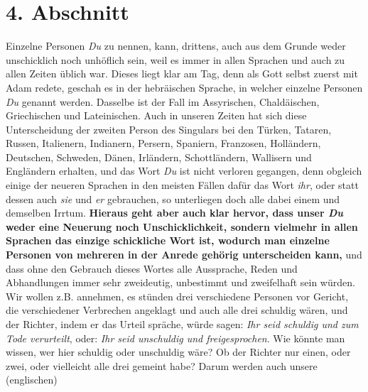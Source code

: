 \section{4. Abschnitt} \label{kap10_ab4}

Einzelne Personen \textit{Du} zu nennen, kann, drittens, auch aus dem Grunde
weder
unschicklich noch unhöflich sein, weil es immer in allen Sprachen und auch zu
allen Zeiten üblich war. Dieses liegt klar am Tag, denn als Gott selbst zuerst
mit Adam redete, geschah es in der hebräischen Sprache, in welcher einzelne
Personen \textit{Du} genannt werden. Dasselbe ist der Fall im
Assyrischen,
Chaldäischen, Griechischen
und Lateinischen. Auch in unseren Zeiten hat sich
diese Unterscheidung der zweiten Person des Singulars bei den
Türken, Tataren,
Russen, Italienern,
Indianern, Persern,
Spaniern, Franzosen,
Holländern,
Deutschen, Schweden,
Dänen, Irländern,
Schottländern, Wallisern
und Engländern erhalten, und das Wort \textit{Du}
ist nicht verloren gegangen,
denn obgleich einige der neueren Sprachen in den meisten Fällen dafür das Wort
\textit{ihr}, oder statt dessen auch \textit{sie} und \textit{er} gebrauchen, so
unterliegen
doch alle dabei einem und demselben Irrtum. \textbf{Hieraus geht aber auch
klar
hervor, dass unser \textit{Du} weder eine Neuerung noch Unschicklichkeit, sondern
vielmehr in allen Sprachen das einzige schickliche Wort ist, wodurch man
einzelne Personen von mehreren in der Anrede gehörig unterscheiden kann,} und dass
ohne den Gebrauch dieses Wortes alle Aussprache, Reden und Abhandlungen immer
sehr zweideutig, unbestimmt und zweifelhaft sein würden. Wir wollen z.B.
annehmen, es stünden drei verschiedene Personen vor Gericht, die verschiedener
Verbrechen angeklagt und auch alle drei schuldig wären, und der Richter, indem
er das Urteil spräche, würde sagen: \textit{Ihr seid schuldig und zum Tode
verurteilt},
oder: \textit{Ihr seid unschuldig und freigesprochen}. Wie könnte man wissen,
wer hier
schuldig oder unschuldig wäre? Ob der Richter nur einen, oder zwei, oder
vielleicht alle drei gemeint habe? Darum werden auch unsere (englischen)
